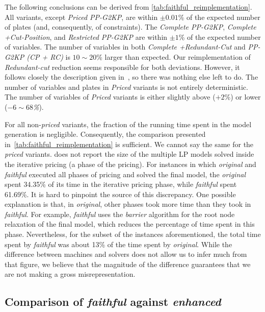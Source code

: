 \documentclass[smallextended]{svjour3}       %
\begin{document}
The following conclusions can be derived from \autoref{tab:faithful_reimplementation}.
All variants, except \emph{Priced PP-G2KP}, are within \(\pm0.01\)\% of the expected number of plates (and, consequently, of constraints).
The \emph{Complete PP-G2KP}, \emph{Complete +Cut-Position}, and \emph{Restricted PP-G2KP} are within \(\pm1\)\% of the expected number of variables.
The number of variables in both \emph{Complete +Redundant-Cut} and \emph{PP-G2KP (CP + RC)} is \(10\sim20\)\% larger than expected.
Our reimplementation of \emph{Redundant-cut} reduction seems responsible for both deviations.
However, it follows closely the description given in~\cite{dimitri_thesis}, so there was nothing else left to do.
The number of variables and plates in \emph{Priced} variants is not entirely deterministic.
The number of variables of \emph{Priced} variants is either slightly above (\(+2\)\%) or lower (\emph{\(-6\sim68\)\%}).

For all non-\emph{priced} variants, the fraction of the running time spent in the model generation is negligible.
Consequently, the comparison presented in~\autoref{tab:faithful_reimplementation} is sufficient.
We cannot say the same for the \emph{priced} variants.
\cite{furini:2016,dimitri_thesis} does not report the size of the multiple LP models solved inside the iterative pricing (a phase of the pricing).
For instances in which \emph{original} and \emph{faithful} executed all phases of pricing and solved the final model, the \emph{original} spent 34.35\% of its time in the iterative pricing phase, while \emph{faithful} spent 61.69\%.
It is hard to pinpoint the source of this discrepancy.
One possible explanation is that, in \emph{original}, other phases took more time than they took in \emph{faithful}.
For example, \emph{faithful} uses the \emph{barrier} algorithm for the root node relaxation of the final model, which reduces the percentage of time spent in this phase.
Nevertheless, for the subset of the instances aforementioned, the total time spent by \emph{faithful} was about 13\% of the time spent by \emph{original}.
While the difference between machines and solvers does not allow us to infer much from that figure, we believe that the magnitude of the difference guarantees that we are not making a gross misrepresentation.

\subsection{Comparison of \emph{faithful} against \emph{enhanced}}
\label{sec:comparison}
\end{document}
